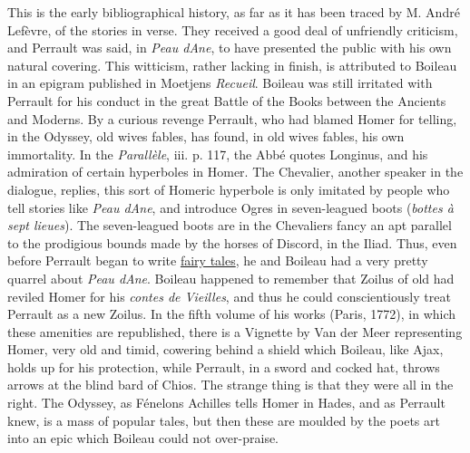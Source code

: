 \documentclass[14pt,a4paper]{memoir}
\newcommand{\ul}[1]{\uline{#1}}
\begin{document}
This is the early bibliographical history, as far as it has been traced
by M. André Lefèvre, of the stories in verse. They received a good deal
of unfriendly criticism, and Perrault was said, in \emph{Peau
d\textquotesingle Ane}, to have presented the public with his own
natural covering. This witticism, rather lacking in finish, is
attributed to Boileau in an epigram published in
Moetjens\textquotesingle{} \emph{Recueil}. Boileau was still irritated
with Perrault for his conduct in the great Battle of the Books between
the Ancients and Moderns. By a curious revenge Perrault, who had blamed
Homer for telling, in the Odyssey, old wives\textquotesingle{} fables,
has found, in old wives\textquotesingle{} fables, his own immortality.
In the \emph{Parallèle}, iii. p. 117, the Abbé quotes Longinus, and his
admiration of certain hyperboles in Homer. The Chevalier, another
speaker in the dialogue, replies, \textquotesingle this sort of Homeric
hyperbole is only imitated by people who tell stories like \emph{Peau
d\textquotesingle Ane}, and introduce Ogres in seven-leagued boots
(\emph{bottes à sept lieues}).\textquotesingle{} The
\textquotesingle seven-leagued boots\textquotesingle{} are in the
Chevalier\textquotesingle s fancy an apt parallel to the prodigious
bounds made by the horses of Discord, in the Iliad. Thus, even before
Perrault began to write \ul{fairy tales}, he and Boileau had a very
pretty quarrel about \emph{Peau d\textquotesingle Ane}. Boileau happened
to remember that Zoilus of old had reviled Homer for his \emph{contes de
Vieilles}, and thus he could conscientiously treat Perrault as a new
Zoilus. In the fifth volume of his works (Paris, 1772), in which these
amenities are republished, there is a Vignette by Van der Meer
representing Homer, very old and timid, cowering behind a shield which
Boileau, like Ajax, holds up for his protection, while Perrault, in a
sword and cocked hat, throws arrows at the blind bard of Chios. The
strange thing is that they were all in the right. The Odyssey, as
Fénelon\textquotesingle s Achilles tells Homer in Hades, and as Perrault
knew, is a mass of popular tales, but then these are moulded by the
poet\textquotesingle s art into an epic which Boileau could not
over-praise.
\end{document}
